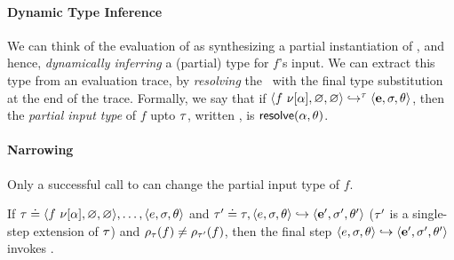 \paragraph{Dynamic Type Inference}
We can think of the evaluation of 
as synthesizing a partial instantiation of \thole, and hence,
\emph{dynamically inferring} a (partial) type for $f$'s input.
%
We can extract this type from an evaluation trace, by
\emph{resolving} the \thole\ with the final type
substitution at the end of the trace.
%
Formally, we say that if
$\langle f\ \nu[\alpha], \varnothing, \varnothing \rangle \hookrightarrow^{\tau} \langle \mathbf{e}, \sigma, \theta \rangle$,
then the \emph{partial input type} of $f$ upto $\tau$, written
, is $\mathsf{resolve}(\alpha, \theta)$.




%


\paragraph{Narrowing}
%
Only a successful call to \forcesym can change the partial
input type of $f$.
%
\begin{lem}
\label{lem:force-inst}
If
$\tau \doteq \langle f\ \nu[\alpha], \varnothing, \varnothing \rangle,\ldots,\langle e, \sigma, \theta \rangle$
and
$\tau' \doteq \tau, \langle e, \sigma, \theta \rangle \hookrightarrow \langle \mathbf{e}', \sigma', \theta' \rangle$
(\ie $\tau'$ is a single-step extension of $\tau$)
and
$\rho_{\tau}(f) \neq \rho_{\tau'}(f)$,
then the final step $\langle e, \sigma, \theta \rangle \hookrightarrow \langle \mathbf{e}', \sigma', \theta' \rangle$ invokes \forcesym.
\end{lem}


